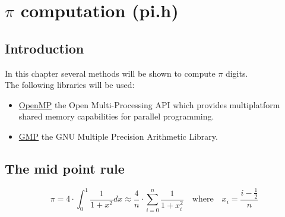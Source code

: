 %
%

\chapter{$\pi$ computation (pi.h)}

\section{Introduction}

In this chapter several methods will be shown to compute $\pi$ digits.\\

The following libraries will be used:
%
\begin{itemize}
\item \href{http://www.openmp.org/}{OpenMP} the Open Multi-Processing API which provides multiplatform shared memory capabilities for parallel programming.
\item \href{https://gmplib.org/}{GMP} the GNU Multiple Precision Arithmetic Library.
\end{itemize}

\section{The mid point rule}

\begin{displaymath}
\pi = 4 \cdot \int_0^1 \frac{1}{1+x^2} dx \approx \frac{4}{n} \cdot \sum_{i=0}^n \frac{1}{1+x_i^2} \quad \textrm{where} \quad x_i = \frac{i -\frac{1}{2}}{n}
\end{displaymath}
